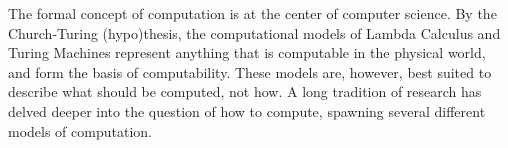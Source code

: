 The formal concept of computation is at the center of computer science.
By the Church-Turing (hypo)thesis, the computational models of Lambda Calculus and Turing Machines represent anything that is computable in the physical world, and form the basis of computability.
These models are, however, best suited to describe what should be computed, not how.
A long tradition of research has delved deeper into the question of how to compute, spawning several different models of computation. 



